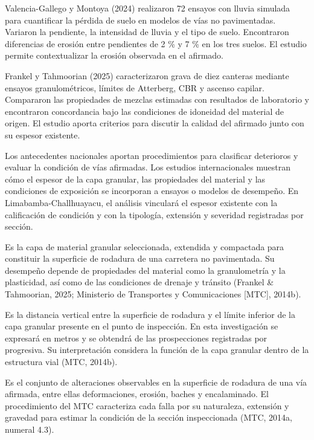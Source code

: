 \documentclass[12pt,a4paper]{article}
\begin{document}
Valencia-Gallego y Montoya (2024) realizaron 72 ensayos con lluvia simulada para cuantificar la pérdida de suelo en modelos de vías no pavimentadas. Variaron la pendiente, la intensidad de lluvia y el tipo de suelo. Encontraron diferencias de erosión entre pendientes de 2 \% y 7 \% en los tres suelos. El estudio permite contextualizar la erosión observada en el afirmado.

Frankel y Tahmoorian (2025) caracterizaron grava de diez canteras mediante ensayos granulométricos, límites de Atterberg, CBR y ascenso capilar. Compararon las propiedades de mezclas estimadas con resultados de laboratorio y encontraron concordancia bajo las condiciones de idoneidad del material de origen. El estudio aporta criterios para discutir la calidad del afirmado junto con su espesor existente.

Los antecedentes nacionales aportan procedimientos para clasificar deterioros y evaluar la condición de vías afirmadas. Los estudios internacionales muestran cómo el espesor de la capa granular, las propiedades del material y las condiciones de exposición se incorporan a ensayos o modelos de desempeño. En Limabamba-Challhuayacu, el análisis vinculará el espesor existente con la calificación de condición y con la tipología, extensión y severidad registradas por sección.


Es la capa de material granular seleccionada, extendida y compactada para constituir la superficie de rodadura de una carretera no pavimentada. Su desempeño depende de propiedades del material como la granulometría y la plasticidad, así como de las condiciones de drenaje y tránsito (Frankel \& Tahmoorian, 2025; Ministerio de Transportes y Comunicaciones [MTC], 2014b).

Es la distancia vertical entre la superficie de rodadura y el límite inferior de la capa granular presente en el punto de inspección. En esta investigación se expresará en metros y se obtendrá de las prospecciones registradas por progresiva. Su interpretación considera la función de la capa granular dentro de la estructura vial (MTC, 2014b).

Es el conjunto de alteraciones observables en la superficie de rodadura de una vía afirmada, entre ellas deformaciones, erosión, baches y encalaminado. El procedimiento del MTC caracteriza cada falla por su naturaleza, extensión y gravedad para estimar la condición de la sección inspeccionada (MTC, 2014a, numeral 4.3).
\end{document}
